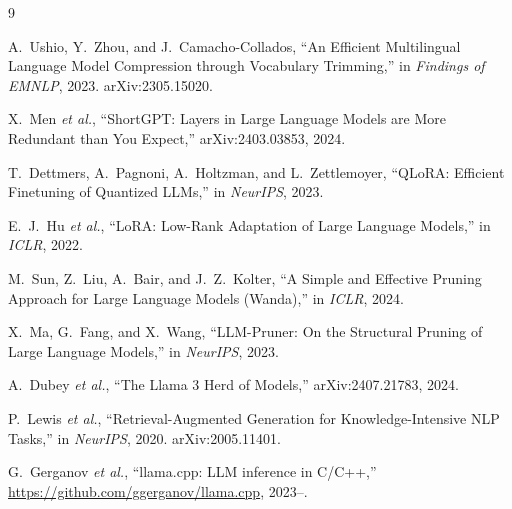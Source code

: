 \documentclass[11pt,a4paper]{article}
\begin{document}
\begin{thebibliography}{9}

A.~Ushio, Y.~Zhou, and J.~Camacho-Collados,
``An Efficient Multilingual Language Model Compression through Vocabulary
Trimming,'' in \emph{Findings of EMNLP}, 2023. arXiv:2305.15020.

X.~Men \emph{et al.},
``ShortGPT: Layers in Large Language Models are More Redundant than You
Expect,'' arXiv:2403.03853, 2024.

T.~Dettmers, A.~Pagnoni, A.~Holtzman, and L.~Zettlemoyer,
``QLoRA: Efficient Finetuning of Quantized LLMs,'' in \emph{NeurIPS}, 2023.

E.~J.~Hu \emph{et al.},
``LoRA: Low-Rank Adaptation of Large Language Models,'' in \emph{ICLR}, 2022.

M.~Sun, Z.~Liu, A.~Bair, and J.~Z.~Kolter,
``A Simple and Effective Pruning Approach for Large Language Models (Wanda),''
in \emph{ICLR}, 2024.

X.~Ma, G.~Fang, and X.~Wang,
``LLM-Pruner: On the Structural Pruning of Large Language Models,''
in \emph{NeurIPS}, 2023.

A.~Dubey \emph{et al.},
``The Llama 3 Herd of Models,'' arXiv:2407.21783, 2024.

P.~Lewis \emph{et al.},
``Retrieval-Augmented Generation for Knowledge-Intensive NLP Tasks,''
in \emph{NeurIPS}, 2020. arXiv:2005.11401.

G.~Gerganov \emph{et al.},
``llama.cpp: LLM inference in C/C++,''
\url{https://github.com/ggerganov/llama.cpp}, 2023--.

\end{thebibliography}
\end{document}
